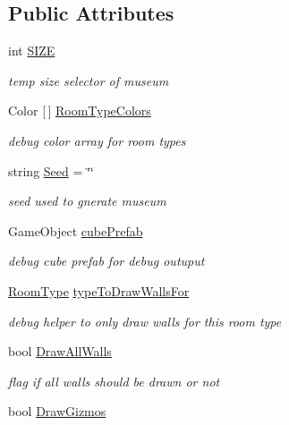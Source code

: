 \subsection*{Public Attributes}
\begin{DoxyCompactItemize}
\item 
int \mbox{\hyperlink{class_museum_generator_a3274560824ac1574cf5b23b70c93f549}{S\+I\+ZE}}
\begin{DoxyCompactList}\small\item\em temp size selector of museum \end{DoxyCompactList}\item 
Color \mbox{[}$\,$\mbox{]} \mbox{\hyperlink{class_museum_generator_abc5bc077cf9c07228ecc90887c534373}{Room\+Type\+Colors}}
\begin{DoxyCompactList}\small\item\em debug color array for room types \end{DoxyCompactList}\item 
string \mbox{\hyperlink{class_museum_generator_a79420e442fa719cbcbceb76df5659209}{Seed}} = \char`\"{}\char`\"{}
\begin{DoxyCompactList}\small\item\em seed used to gnerate museum \end{DoxyCompactList}\item 
Game\+Object \mbox{\hyperlink{class_museum_generator_ae7a748c64ae256fdc85e29a79a2fc0a8}{cube\+Prefab}}
\begin{DoxyCompactList}\small\item\em debug cube prefab for debug outuput \end{DoxyCompactList}\item 
\mbox{\hyperlink{_room_8cs_ab540f7414f306325d92272bcef1e34e1}{Room\+Type}} \mbox{\hyperlink{class_museum_generator_afba388daa5228b0542ebdf7799521ca9}{type\+To\+Draw\+Walls\+For}}
\begin{DoxyCompactList}\small\item\em debug helper to only draw walls for this room type \end{DoxyCompactList}\item 
bool \mbox{\hyperlink{class_museum_generator_a3a354ad136bc8f11fce23708625ccfde}{Draw\+All\+Walls}}
\begin{DoxyCompactList}\small\item\em flag if all walls should be drawn or not \end{DoxyCompactList}\item 
bool \mbox{\hyperlink{class_museum_generator_a102f8361f66eb629d3ad5c9951616b42}{Draw\+Gizmos}}

\end{DoxyCompactItemize}
